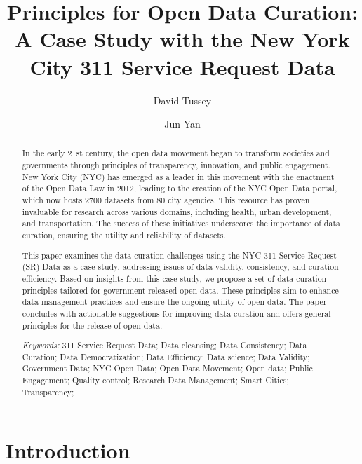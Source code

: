 \documentclass[12pt, titlepage]{article}
\title{Principles for Open Data Curation: A Case Study with the New
  York City 311 Service Request Data}
\author[1]{David Tussey}
\author[2]{Jun Yan}
\affil[1]{Former Executive Director, NYC DoITT}
\affil[2]{Department of Statistics, University of Connecticut}
\begin{document}
\maketitle

\tableofcontents %
\listoffigures %
\listoftables %


\begin{abstract}
  In the early 21st century, the open data movement began to transform societies and governments through principles of transparency, 
  innovation, and public engagement. New York City (NYC) has emerged as a leader in this movement 
  with the enactment of the Open Data Law in 2012, leading to the creation of the NYC Open Data portal, 
  which now hosts 2700 datasets from 80 city agencies. This resource has proven invaluable for research 
  across various domains, including health, urban development, and transportation. 
  The success of these initiatives underscores the importance of data curation, ensuring the utility and reliability of datasets. 

This paper examines the data curation challenges using the NYC 311 Service Request (SR) Data as a case study, 
  addressing issues of data validity, consistency, and curation efficiency. Based on insights from this case study, 
  we propose a set of data curation principles tailored for government-released open data. 
  These principles aim to enhance data management practices and ensure the ongoing utility of open data. 
  The paper concludes with actionable suggestions for improving data curation 
  and offers general principles for the release of open data.

\bigskip
  
\noindent
\textit{Keywords:}
311 Service Request Data;
Data cleansing;
Data Consistency;
Data Curation;
Data Democratization;
Data Efficiency;
Data science;
Data Validity;
Government Data;
NYC Open Data;
Open Data Movement;
Open data;
Public Engagement;
Quality control;
Research Data Management;
Smart Cities;
Transparency;
\end{abstract}

\doublespacing

\section{Introduction} \label{sec:intro}
\end{document}
